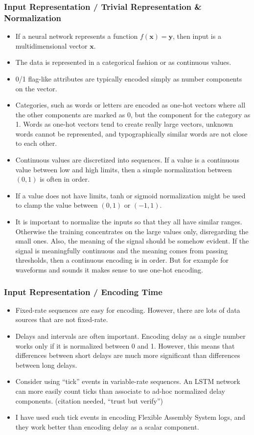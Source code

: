 \documentclass[8pt]{beamer}
\begin{document}
\begin{frame}
\frametitle{Input Representation / Trivial Representation \& Normalization}
 \begin{itemize}
  \item If a neural network represents a function $ f(\mathbf{x}) = \mathbf{y} $, then input is a multidimensional vector $ \mathbf{x} $.
  \item The data is represented in a categorical fashion or as continuous values.
  \item 0/1 flag-like attributes are typically encoded simply as number components on the vector.
  \item Categories, such as words or letters are encoded as one-hot
        vectors where all the other components are marked as 0, but the component for the category as 1. Words as one-hot vectors tend to create really large vectors,
        unknown words cannot be represented, and typographically similar words are not close to each other.
  \item Continuous values are discretized into sequences. If a value is a continuous value between low and high limits, then a simple normalization between $ (0, 1) $
        is often in order.
  \item If a value does not have limits, tanh or sigmoid normalization might be used to clamp the value between $ (0, 1) $ or $(-1, 1) $.
  \item It is important to normalize the inputs so that they all have similar ranges. Otherwise the training concentrates on the large values only, disregarding the small ones.
        Also, the meaning of the signal should be somehow evident. If the signal is meaningfully continuous and the meaning comes from passing thresholds, then a continuous
        encoding is in order. But for example for waveforms and sounds it makes sense to use one-hot encoding.
 \end{itemize}
\end{frame}

\begin{frame}
\frametitle{Input Representation / Encoding Time}
 \begin{itemize}
  \item Fixed-rate sequences are easy for encoding. However, there are lots of data sources that are not fixed-rate.
  \item Delays and intervals are often important. Encoding delay as a single number works only if it is normalized between 0 and 1. However, this means that
        differences between short delays are much more significant than differences between long delays.
  \item Consider using ``tick'' events in variable-rate sequences. An LSTM network can more easily count ticks than associate to ad-hoc normalized delay components.
        (citation needed, ``trust but verify'')
  \item I have used such tick events in encoding Flexible Assembly System logs, and they work better than encoding delay as a scalar component.
 \end{itemize}
\end{frame}
\end{document}
